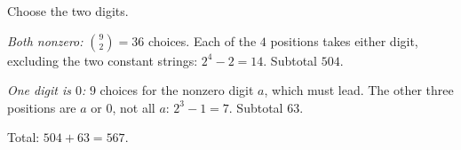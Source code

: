 Choose the two digits.

\emph{Both nonzero:} $\binom92=36$ choices. Each of the $4$ positions takes either digit, excluding the two constant strings: $2^4-2=14$. Subtotal $504$.

\emph{One digit is $0$:} $9$ choices for the nonzero digit $a$, which must lead. The other three positions are $a$ or $0$, not all $a$: $2^3-1=7$. Subtotal $63$.

Total: $504+63=\boxed{567}$.

